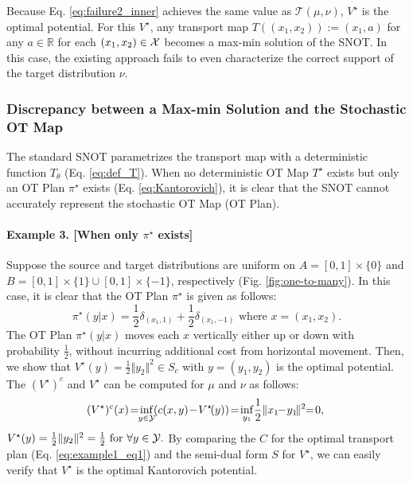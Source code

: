 Because Eq. \ref{eq:failure2_inner} achieves the same value as $\mathcal{T}(\mu, \nu)$, $V^{\star}$ is the optimal potential. For this $V^{\star}$, any transport map $T((x_1, x_2)):= (x_1, a)$ for any $a \in \mathbb{R}$ for each $(x_1, x_2) \in {\mathcal{X}}$ becomes a max-min solution of the SNOT. In this case, the existing approach fails to even characterize the correct support of the target distribution $\nu$.

\subsubsection{Discrepancy between a Max-min Solution and the Stochastic OT Map}
\label{sec:fail_no_det}

The standard SNOT parametrizes the transport map with a deterministic function $T_{\theta}$ (Eq. \ref{eq:def_T}). 
When no deterministic OT Map $T^{\star}$ exists but only an  OT Plan $\pi^{\star}$ exists (Eq. \ref{eq:Kantorovich}), it is clear that the SNOT cannot accurately represent the stochastic OT Map (OT Plan).


\paragraph{Example 3. [When only $\pi^{\star}$ exists]} 

Suppose the source and target distributions are uniform on $A = [0,1]\times \{ 0 \}$ and $B = [0,1]\times \{1\} \cup [0,1] \times \{-1 \}$, respectively (Fig. \ref{fig:one-to-many}). 
In this case, it is clear that the OT Plan $\pi^{\star}$ is given as follows:
\begin{equation} \label{eq:example1_eq1}
    \pi^{\star}(y|x) = \frac{1}{2} \delta_{(x_1, 1)} + \frac{1}{2} \delta_{(x_1, -1)} \text{ where } x\!=\!\!(x_1, x_2).
\end{equation}
The OT Plan $\pi^{\star}(y|x)$ moves each $x$ vertically either up or down with probability $\frac{1}{2}$, without incurring additional cost from horizontal movement. Then, we show that $V^\star(y) = \frac{1}{2} \Vert y_2 \Vert^2 \in S_{c}$ with $y = (y_1, y_2)$ is the optimal potential. The $(V^\star)^c$ and $V^{\star}$ can be computed for $\mu$ and $\nu$ as follows:
\vspace{-3pt}
\begin{align} 
    \!\!(V^{\star})^c(x)\! = \!\!\inf_{y \in \fY}\!\! \left( c(x,y) \!- \!V^{\star}\!(y) \right)\! = \!\inf_{y_1} \! \frac{1}{2} \Vert x_1 \!\!-\! y_1 \!\Vert^2 \!\!=\!0,\! \label{eq:example1_eq2} 
\end{align}
$V^{\star}(y) = \frac{1}{2} \Vert y_2\Vert^2 = \frac{1}{2} \text{ for } \forall y \in {\mathcal{Y}}.$
By comparing the $C$ for the optimal transport plan (Eq. \ref{eq:example1_eq1}) and the semi-dual form $S$ for $V^\star$, we can easily verify that $V^\star$ is the optimal Kantorovich potential.

